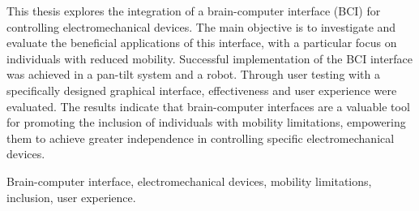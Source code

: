 \newpage 
\vspace*{200px}
\thispagestyle{empty}

\begin{abstract_en}
{\em

This thesis explores the integration of a brain-computer interface (BCI) for controlling electromechanical devices. The main objective is to investigate and evaluate the beneficial applications of this interface, with a particular focus on individuals with reduced mobility. Successful implementation of the BCI interface was achieved in a pan-tilt system and a robot. Through user testing with a specifically designed graphical interface, effectiveness and user experience were evaluated. The results indicate that brain-computer interfaces are a valuable tool for promoting the inclusion of individuals with mobility limitations, empowering them to achieve greater independence in controlling specific electromechanical devices.
}

\bigskip
\em
\begin {keywords}
Brain-computer interface, electromechanical devices, mobility limitations, inclusion, user experience.
\end {keywords}

\end{abstract_en}